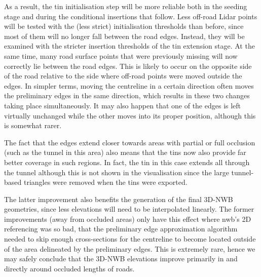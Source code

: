 As a result, the \ac{tin} initialisation step will be more reliable both in the seeding stage and during the conditional insertions that follow. Less off-road Lidar points will be tested with the (less strict) initialisation thresholds than before, since most of them will no longer fall between the road edges. Instead, they will be examined with the stricter insertion thresholds of the \ac{tin} extension stage. At the same time, many road surface points that were previously missing will now correctly lie between the road edges. This is likely to occur on the opposite side of the road relative to the side where off-road points were moved outside the edges. In simpler terms, moving the centreline in a certain direction often moves the preliminary edges in the same direction, which results in these two changes taking place simultaneously. It may also happen that one of the edges is left virtually unchanged while the other moves into its proper position, although this is somewhat rarer.

The fact that the edges extend closer towards areas with partial or full occlusion (such as the tunnel in this area) also means that the \ac{tin}s now also provide far better coverage in such regions. In fact, the \ac{tin} in this case extends all through the tunnel although this is not shown in the visualisation since the large tunnel-based triangles were removed when the \ac{tin}s were exported.

The latter improvement also benefits the generation of the final 3D-NWB geometries, since less elevations will need to be interpolated linearly. The former improvements (away from occluded areas) only have this effect where \ac{nwb}'s 2D referencing was so bad, that the preliminary edge approximation algorithm needed to skip enough cross-sections for the centreline to become located outside of the area delineated by the preliminary edges. This is extremely rare, hence we may safely conclude that the 3D-NWB elevations improve primarily in and directly around occluded lengths of roads.

